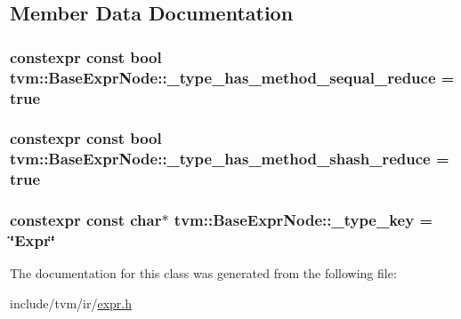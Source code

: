 \subsection{Member Data Documentation}
\subsubsection[{\texorpdfstring{\+\_\+type\+\_\+has\+\_\+method\+\_\+sequal\+\_\+reduce}{_type_has_method_sequal_reduce}}]{\setlength{\rightskip}{0pt plus 5cm}constexpr const bool tvm\+::\+Base\+Expr\+Node\+::\+\_\+type\+\_\+has\+\_\+method\+\_\+sequal\+\_\+reduce = true\hspace{0.3cm}{\ttfamily [static]}}\hypertarget{classtvm_1_1BaseExprNode_a905dcf65204e877b6ccb977cf375f2a0}{}\label{classtvm_1_1BaseExprNode_a905dcf65204e877b6ccb977cf375f2a0}
\subsubsection[{\texorpdfstring{\+\_\+type\+\_\+has\+\_\+method\+\_\+shash\+\_\+reduce}{_type_has_method_shash_reduce}}]{\setlength{\rightskip}{0pt plus 5cm}constexpr const bool tvm\+::\+Base\+Expr\+Node\+::\+\_\+type\+\_\+has\+\_\+method\+\_\+shash\+\_\+reduce = true\hspace{0.3cm}{\ttfamily [static]}}\hypertarget{classtvm_1_1BaseExprNode_a13d7d1f1e6f790951caf200cd59c3620}{}\label{classtvm_1_1BaseExprNode_a13d7d1f1e6f790951caf200cd59c3620}
\subsubsection[{\texorpdfstring{\+\_\+type\+\_\+key}{_type_key}}]{\setlength{\rightskip}{0pt plus 5cm}constexpr const char$\ast$ tvm\+::\+Base\+Expr\+Node\+::\+\_\+type\+\_\+key = \char`\"{}Expr\char`\"{}\hspace{0.3cm}{\ttfamily [static]}}\hypertarget{classtvm_1_1BaseExprNode_a0cc4e898dbc3b52d785fc3e515663c61}{}\label{classtvm_1_1BaseExprNode_a0cc4e898dbc3b52d785fc3e515663c61}


The documentation for this class was generated from the following file\+:\begin{DoxyCompactItemize}
\item 
include/tvm/ir/\hyperlink{ir_2expr_8h}{expr.\+h}\end{DoxyCompactItemize}
